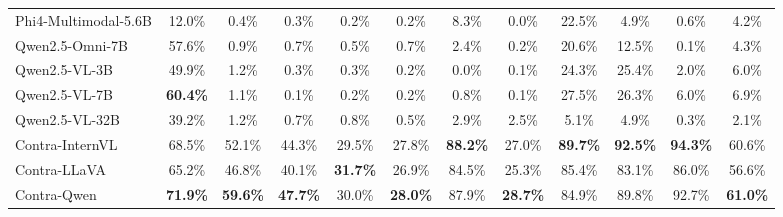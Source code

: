 \documentclass[11pt]{article}
\begin{document}
\begin{table}[htbp]
{\begin{tabular}{lccccccccccc}
Phi4-Multimodal-5.6B           & 12.0\% & 0.4\% & 0.3\% & 0.2\% & 0.2\% & 8.3\% & 0.0\% & 22.5\% & 4.9\% & 0.6\% & 4.2\% \\
Qwen2.5-Omni-7B          & 57.6\% & 0.9\% & 0.7\% & 0.5\% & 0.7\% & 2.4\% & 0.2\% & 20.6\% & 12.5\% & 0.1\% & 4.3\% \\
Qwen2.5-VL-3B         & 49.9\% & 1.2\% & 0.3\% & 0.3\% & 0.2\% & 0.0\% & 0.1\% & 24.3\% & 25.4\% & 2.0\% & 6.0\% \\
Qwen2.5-VL-7B         & \textbf{60.4\%} & 1.1\% & 0.1\% & 0.2\% & 0.2\% & 0.8\% & 0.1\% & 27.5\% & 26.3\% & 6.0\% & 6.9\% \\
Qwen2.5-VL-32B        & 39.2\% & 1.2\% & 0.7\% & 0.8\% & 0.5\% & 2.9\% & 2.5\% & 5.1\% & 4.9\% & 0.3\% & 2.1\% \\
\midrule
Contra-InternVL         & 68.5\% & 52.1\% & 44.3\% & 29.5\% & 27.8\% & \textbf{88.2\%} & 27.0\% & \textbf{89.7\%} & \textbf{92.5\%} & \textbf{94.3\%} & 60.6\% \\
Contra-LLaVA            & 65.2\% & 46.8\% & 40.1\% & \textbf{31.7\%} & 26.9\% & 84.5\% & 25.3\% & 85.4\% & 83.1\% & 86.0\% & 56.6\% \\
Contra-Qwen            & \textbf{71.9\%} & \textbf{59.6\%} & \textbf{47.7\%} & 30.0\% & \textbf{28.0\%} & 87.9\% & \textbf{28.7\%} & 84.9\% & 89.8\% & 92.7\% & \textbf{61.0\%} \\
\bottomrule
\end{tabular}
}
\end{table}
\end{document}
